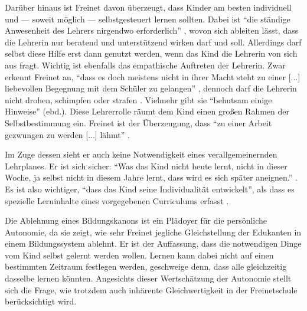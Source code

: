 Darüber hinaus ist Freinet davon überzeugt, dass Kinder am besten individuell und --- soweit möglich --- selbstgesteuert lernen sollten.
Dabei ist ``die ständige Anwesenheit des Lehrers nirgendwo erforderlich'' \parencite[105]{Freinet1979}, wovon sich ableiten lässt, dass die Lehrerin nur beratend und unterstützend wirken darf und soll.
Allerdings darf selbst diese Hilfe erst dann genutzt werden, wenn das Kind die Lehrerin von sich aus fragt.
Wichtig ist ebenfalls das empathische Auftreten der Lehrerin.
Zwar erkennt Freinet an, ``dass es doch meistens nicht in ihrer Macht steht zu einer [...] liebevollen Begegnung mit dem Schüler zu gelangen'' \parencite[101]{Freinet1979}, dennoch darf die Lehrerin nicht drohen, schimpfen oder strafen \parencite[103]{Freinet1979}.
Vielmehr gibt sie ``behutsam einige Hinweise'' (ebd.).
Diese Lehrerrolle räumt dem Kind einen großen Rahmen der Selbstbestimmung ein.
Freinet ist der Überzeugung, dass ``zu einer Arbeit gezwungen zu werden [...] lähmt'' \parencite[vgl.][495]{Freinet-2000a}.

Im Zuge dessen sieht er auch keine Notwendigkeit eines verallgemeinernden Lehrplanes.
Er ist sich sicher: ``Was das Kind nicht heute lernt, nicht in dieser Woche, ja selbst nicht in diesem Jahre lernt, dass wird es sich später aneignen.'' \parencite[101]{Freinet1979}.
Es ist also wichtiger, ``dass das Kind seine Individualität entwickelt'', als dass es spezielle Lerninhalte eines vorgegebenen Curriculums erfasst \parencite[105]{Freinet1979}.

Die Ablehnung eines Bildungskanons ist ein Plädoyer für die persönliche Autonomie, da sie zeigt, wie sehr Freinet jegliche Gleichstellung der Edukanten in einem Bildungssystem ablehnt.
Er ist der Auffassung, dass die notwendigen Dinge vom Kind selbst gelernt werden wollen.
Lernen kann dabei nicht auf einen bestimmten Zeitraum festlegen werden, geschweige denn, dass alle gleichzeitig dasselbe lernen könnten.
Angesichts dieser Wertschätzung der Autonomie stellt sich die Frage, wie trotzdem auch inhärente Gleichwertigkeit in der Freinetschule berücksichtigt wird.

